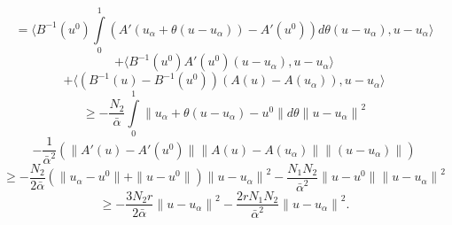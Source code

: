 $$=\langle B^{-1}(u^0)\int\limits_0^1 (A'(u_\alpha+\theta(u-u_\alpha))-A'(u^0))d\theta (u-u_\alpha), u-u_\alpha\rangle$$
$$+ \langle B^{-1}(u^0)A'(u^0)(u-u_\alpha), u-u_\alpha\rangle $$
$$+\langle (B^{-1}(u)-B^{-1}(u^0))(A(u)-A(u_\alpha)), u-u_\alpha\rangle$$
$$\ge-\frac{N_2}{\bar\alpha}\int\limits_0^1\|u_\alpha+\theta(u-u_\alpha)-u^0\|d\theta {\|u-u_\alpha\|}^2 $$
$$-\frac{1}{{\bar\alpha}^2}\left ( \|A'(u)-A'(u^0)\|\|A(u)-A(u_\alpha)\|\|(u-u_\alpha)\|\right ) $$$$ \ge - \frac{N_2}{2\bar\alpha} \left ( \|u_\alpha-u^0\|+\|u-u^0\|\right ){\|u-u_\alpha\|}^2 - \frac{N_1 N_2}{{\bar\alpha}^2}\|u-u^0\| {\|u-u_\alpha\|}^2 $$
\begin{equation}\label{ineq2.11}
\ge -\frac{3N_2r}{2\bar\alpha}{\|u-u_\alpha\|}^2-\frac{2rN_1 N_2}{{\bar\alpha}^2}{\|u-u_\alpha\|}^2.\end{equation}

